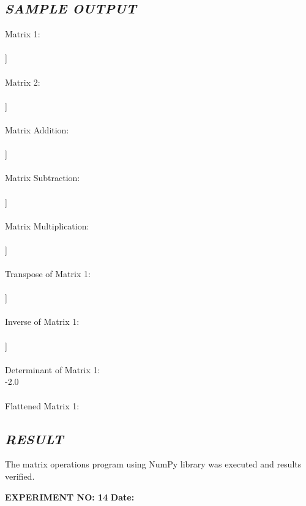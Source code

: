 \documentclass[11pt,a4paper]{article}
\begin{document}
\subsection*{\textit{SAMPLE OUTPUT}}
\begin{tcolorbox}[colback=black!85,colframe=navyblue,title=\textbf{Terminal Output},coltitle=white,fonttitle=\bfseries\small]
\small\ttfamily\color{green!30!white}
Matrix 1:\\
[[1 2]\\
 [3 4]]\\
\\
Matrix 2:\\
[[5 6]\\
 [7 8]]\\
\\
Matrix Addition:\\
[[ 6  8]\\
 [10 12]]\\
\\
Matrix Subtraction:\\
[[-4 -4]\\
 [-4 -4]]\\
\\
Matrix Multiplication:\\
[[19 22]\\
 [43 50]]\\
\\
Transpose of Matrix 1:\\
[[1 3]\\
 [2 4]]\\
\\
Inverse of Matrix 1:\\
[[-2.   1. ]\\
 [ 1.5 -0.5]]\\
\\
Determinant of Matrix 1:\\
-2.0\\
\\
Flattened Matrix 1:\\
[1 2 3 4]
\end{tcolorbox}

\subsection*{\textit{RESULT}}
The matrix operations program using NumPy library was executed and results verified.

\newpage

\noindent
\textbf{\large EXPERIMENT NO: 14} \hfill \textbf{\large Date: \underline{\hspace{3cm}}}
\end{document}
